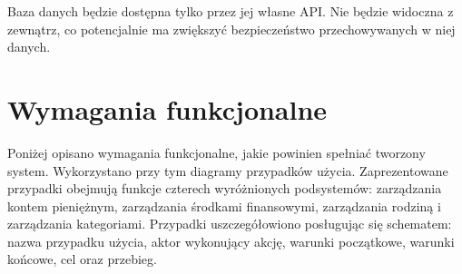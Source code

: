 Baza danych będzie dostępna tylko przez jej własne API. Nie będzie widoczna z zewnątrz, co potencjalnie ma zwiększyć bezpieczeństwo przechowywanych w niej danych.

\section{Wymagania funkcjonalne}
\label{sec:wymagania-funkcjonalne}
Poniżej opisano wymagania funkcjonalne, jakie powinien spełniać tworzony system. Wykorzystano przy tym diagramy przypadków użycia. Zaprezentowane przypadki obejmują funkcje czterech wyróżnionych podsystemów: zarządzania kontem pieniężnym, zarządzania środkami finansowymi, zarządzania rodziną i zarządzania kategoriami. Przypadki uszczegółowiono posługując się schematem: nazwa przypadku użycia, aktor wykonujący akcję, warunki początkowe, warunki końcowe, cel oraz przebieg. 

